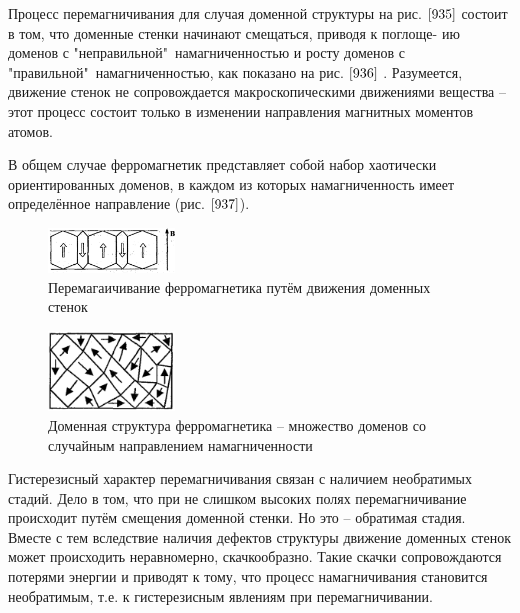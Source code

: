 \documentclass[a4paper,14pt]{article} %
\begin{document}
Процесс перемагничивания для случая доменной структуры на рис. $\ref{935}$ состоит в том, что доменные стенки начинают смещаться, приводя к $\textbf{поглоще-}$ $\textbf{ию}$ доменов с "неправильной"\ намагниченностью и $\textbf{росту}$ доменов с "правильной"\ намагниченностью, как показано на рис. $\ref{936}$ . Разумеется, движение стенок не сопровождается макроскопическими движениями вещества -- этот процесс состоит только в изменении направления магнитных моментов атомов.

В общем случае ферромагнетик представляет собой набор хаотически ориентированных доменов, в каждом из которых намагниченность имеет определённое направление (рис. $\ref{937}$).

\begin{figure}[h!]

\begin{center}
\includegraphics[width=0.3\textwidth]{9.3.6.png} 
\end{center}
\caption{Перемагаичивание ферромагнетика путём движения доменных стенок}
\label{936}
\end{figure}

\begin{figure}[h!]

\begin{center}
\includegraphics[width=0.3\textwidth]{9.3.7.png} 
\end{center}
\caption{Доменная структура ферромагнетика -- множество  доменов со случайным направлением намагниченности}
\label{937}
\end{figure}

Гистерезисный характер перемагничивания связан с наличием необратимых стадий. Дело в том, что при не слишком высоких полях перемагничивание происходит путём смещения доменной стенки. Но это -- обратимая стадия. Вместе с тем вследствие наличия дефектов структуры движение доменных стенок может происходить неравномерно, скачкообразно. Такие скачки сопровождаются потерями энергии и приводят к тому, что процесс намагничивания становится необратимым, т.е. к гистерезисным явлениям при перемагничивании.
\end{document}
